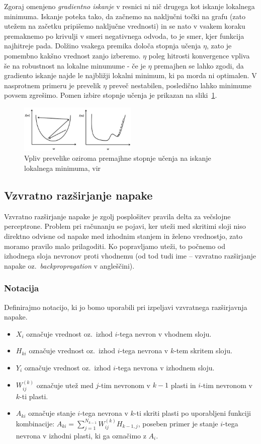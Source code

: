 \documentclass[mat1]{fmfdelo}
\begin{document}
Zgoraj omenjeno \emph{gradientno iskanje} v resnici ni nič drugega kot iskanje lokalnega minimuma. Iskanje poteka tako, da začnemo na naključni točki na grafu (zato utežem na začetku pripišemo naključne vrednosti) in se nato v vsakem koraku premaknemo po krivulji v smeri negativnega odvoda, to je smer, kjer funkcija najhitreje pada. Dolžino vsakega premika določa stopnja učenja $\eta$, zato je pomembno kakšno vrednost zanjo izberemo. $\eta$ poleg hitrosti konvergence vpliva še na robustnost na lokalne
minumume - če je $\eta$ premajhen se lahko zgodi, da gradiento iskanje najde le najbližji lokalni minimum, ki pa morda ni optimalen. V nasprotnem primeru je prevelik $\eta$ preveč nestabilen, posledično lahko minimume povsem zgrešimo. Pomen izbire stopnje učenja je prikazan na sliki~\ref{fig:gradi}.
%
\begin{figure}[!ht]
	\centering
	\includegraphics[width=0.5\textwidth]{gradient-descent.jpg}
	\caption{Vpliv prevelike oziroma premajhne stopnje učenja na iskanje lokalnega minimuma, vir~\cite{grad}}
		\label{fig:gradi}
\end{figure}

\subsection{Vzvratno razširjanje napake}
Vzvratno razširjanje napake je zgolj posplošitev pravila delta za večslojne perceptrone. Problem pri računanju se pojavi, ker uteži med skritimi sloji niso direktno odvisne od napake med izhodnim stanjem in želeno vrednostjo, zato moramo pravilo malo prilagoditi. Ko popravljamo uteži, to počnemo od izhodnega sloja nevronov proti vhodnemu (od tod tudi ime --  vzvratno razširjanje napake oz.\ \emph{backpropragation} v angleščini). 

\subsubsection{Notacija}
Definirajmo notacijo, ki jo bomo uporabili pri izpeljavi vzvratnega razširjavnja napake. 
\begin{itemize}
\item $X_{i}$ označuje vrednost oz.\ izhod $i$-tega nevron v vhodnem sloju.
\item $H_{ki}$ označuje vrednost oz.\ izhod $i$-tega nevrona v $k$-tem skritem sloju. 
\item $Y_i$ označuje vrednost oz.\ izhod $i$-tega nevrona v izhodnem sloju.
\item $W^{(k)}_{ij}$ označuje utež med $j$-tim nevronom v  $k-1$ plasti in $i$-tim nevronom v $k$-ti plasti.
\item $A_{ki}$ označuje stanje $i$-tega nevrona v $k$-ti skriti plasti po uporabljeni funkciji kombinacije: $A_{ki} = \sum^{N_{k-1}}_{j=1}W^{(k)}_{ij}H_{k-1,j}$, poseben primer je stanje $i$-tega nevrona v izhodni plasti, ki ga označimo z $A_i$.
\end{itemize}
\end{document}
